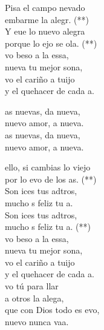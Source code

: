 \documentclass[12pt]{article}
\begin{document}
\begin{multicols*}{2}
\begin{cancion}%
	Pisa el campo nevado\\
	embarme la alegr. (**) \\
	Y eue lo nuevo  alegra \\
	porque lo ejo se ola. (**)\\
	vo beso a la essa, \\
	nueva tu mejor sona,\\
	vo el cariño a tuijo \\
	y el quehacer de cada a.\\
	\begin{chorus}%
	as nuevas, da nueva, \\
	nuevo amor, a nueva.\\
	as nuevas, da nueva, \\
	nuevo amor, a nueva.\\
	\end{chorus}%
	 ello, si cambias lo viejo \\
	por lo evo de los as. (**)\\
	Son ices tus adtros, \\
	mucho s feliz tu a. \\
	Son ices tus adtros, \\
	mucho s feliz tu a. (**) \\
	vo beso a la essa, \\
	nueva tu mejor sona,\\
	vo el cariño a tuijo \\
	y el quehacer de cada a.\\
	vo tú para llar \\
	a otros la alega,\\
	que con Dios todo es evo, \\
	nuevo nunca vaa.\\
\end{cancion}%
    \end{multicols*}
\end{document}
